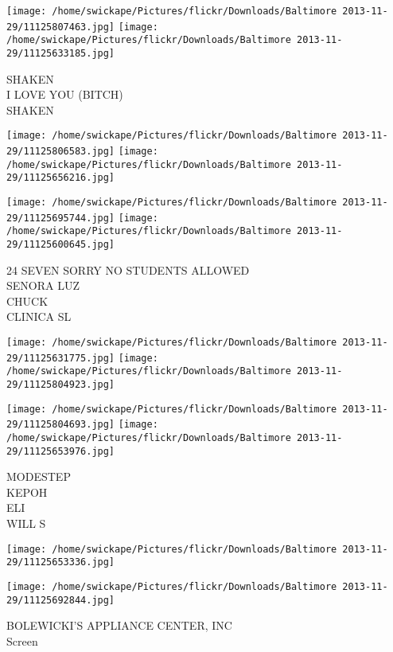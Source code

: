 \documentclass[10pt,letterpaper]{article}
\begin{document}
\vspace{0.25in}
\texttt{[image: /home/swickape/Pictures/flickr/Downloads/Baltimore 2013-11-29/11125807463.jpg]}
\texttt{[image: /home/swickape/Pictures/flickr/Downloads/Baltimore 2013-11-29/11125633185.jpg]}

SHAKEN\\
I LOVE YOU (BITCH)\\
SHAKEN\\
\pagebreak

\texttt{[image: /home/swickape/Pictures/flickr/Downloads/Baltimore 2013-11-29/11125806583.jpg]}
\texttt{[image: /home/swickape/Pictures/flickr/Downloads/Baltimore 2013-11-29/11125656216.jpg]}

\texttt{[image: /home/swickape/Pictures/flickr/Downloads/Baltimore 2013-11-29/11125695744.jpg]}
\texttt{[image: /home/swickape/Pictures/flickr/Downloads/Baltimore 2013-11-29/11125600645.jpg]}

24 SEVEN SORRY NO STUDENTS ALLOWED\\
SENORA LUZ\\
CHUCK\\
CLINICA SL\\
\pagebreak

\texttt{[image: /home/swickape/Pictures/flickr/Downloads/Baltimore 2013-11-29/11125631775.jpg]}
\texttt{[image: /home/swickape/Pictures/flickr/Downloads/Baltimore 2013-11-29/11125804923.jpg]}

\texttt{[image: /home/swickape/Pictures/flickr/Downloads/Baltimore 2013-11-29/11125804693.jpg]}
\texttt{[image: /home/swickape/Pictures/flickr/Downloads/Baltimore 2013-11-29/11125653976.jpg]}

MODESTEP\\
KEPOH\\
ELI\\
WILL S\\
\pagebreak

\texttt{[image: /home/swickape/Pictures/flickr/Downloads/Baltimore 2013-11-29/11125653336.jpg]}

\vspace{0.25in}
\texttt{[image: /home/swickape/Pictures/flickr/Downloads/Baltimore 2013-11-29/11125692844.jpg]}

BOLEWICKI'S APPLIANCE CENTER, INC\\
Screen\\
\pagebreak
\end{document}
